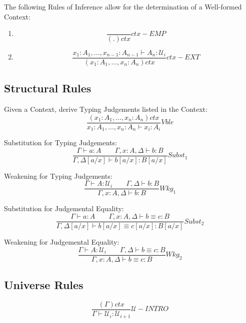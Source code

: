 The following Rules of Inference allow for the determination of a
Well-formed Context:
\begin{enumerate}
\item
\[
  {
    \frac{}{(.)ctx}
  } ctx-EMP
\]
\item
\[
  {
    \frac
    {x_1:A_1, \ldots, x_{n-1}:A_{n-1} \vdash A_n : \mathcal{U}_i}
    {(x_1:A_1,\ldots,x_n:A_n) ctx}
  } ctx-EXT
\]
\end{enumerate}



\subsection{Structural Rules}

Given a Context, derive Typing Judgements listed in the Context:
\[
  {
    \frac
    {(x_1:A_1, \ldots, x_n:A_n)ctx}
    {x_1:A_1, \ldots, x_n:A_n \vdash x_i:A_i}
  } Vble
\]

Substitution for Typing Judgements:
\[
  {
    \frac
    {\Gamma \vdash a : A \;\;\;\;\;\;\;
    \Gamma,x:A,\Delta \vdash b : B}
    {\Gamma,\Delta[a/x] \vdash b[a/x] : B[a/x]}
  } Subst_1
\]

Weakening for Typing Judgements:
\[
  {
    \frac
    {\Gamma \vdash A : \mathcal{U}_i \;\;\;\;\;\;\;
    \Gamma,\Delta \vdash b : B}
    {\Gamma,x:A,\Delta \vdash b:B}
  } Wkg_1
\]

Substitution for Judgemental Equality:
\[
  {
    \frac
    {\Gamma \vdash a : A \;\;\;\;\;\;\;
    \Gamma,x:A,\Delta \vdash b \equiv c : B}
    {\Gamma,\Delta[a/x] \vdash b[a/x] \equiv c[a/x] : B[a/x]}
  } Subst_2
\]

Weakening for Judgemental Equality:
\[
  {
    \frac
    {\Gamma \vdash A : \mathcal{U}_i \;\;\;\;\;\;\;
    \Gamma,\Delta \vdash b \equiv c : B}
    {\Gamma, x:A, \Delta \vdash b \equiv c : B}
  } Wkg_2
\]



\subsection{Universe Rules}\label{sec:universe_rules}

\[
  {
    \frac
    {(\Gamma) ctx}
    {\Gamma \vdash \mathcal{U}_i : \mathcal{U}_{i+1}}
  } \mathcal{U}-INTRO
\]

